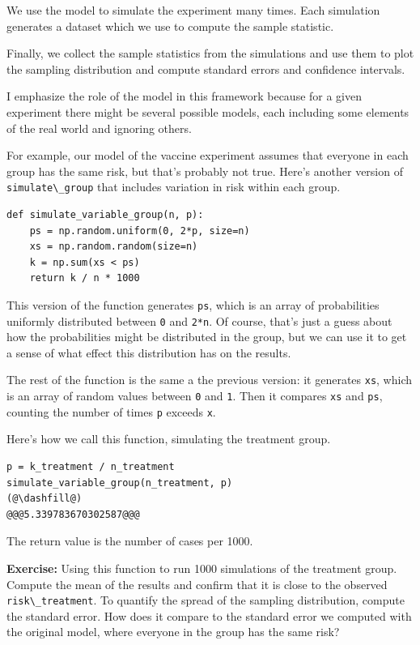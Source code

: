 We use the model to simulate the experiment many times. Each simulation
generates a dataset which we use to compute the sample statistic.

Finally, we collect the sample statistics from the simulations and use
them to plot the sampling distribution and compute standard errors and
confidence intervals.

I emphasize the role of the model in this framework because for a given
experiment there might be several possible models, each including some
elements of the real world and ignoring others.

For example, our model of the vaccine experiment assumes that everyone
in each group has the same risk, but that's probably not true. Here's
another version of \passthrough{\lstinline!simulate\_group!} that
includes variation in risk within each group.

\begin{lstlisting}[]
def simulate_variable_group(n, p):
    ps = np.random.uniform(0, 2*p, size=n)
    xs = np.random.random(size=n)
    k = np.sum(xs < ps)
    return k / n * 1000
\end{lstlisting}

This version of the function generates \passthrough{\lstinline!ps!},
which is an array of probabilities uniformly distributed between
\passthrough{\lstinline!0!} and \passthrough{\lstinline!2*n!}. Of
course, that's just a guess about how the probabilities might be
distributed in the group, but we can use it to get a sense of what
effect this distribution has on the results.

The rest of the function is the same a the previous version: it
generates \passthrough{\lstinline!xs!}, which is an array of random
values between \passthrough{\lstinline!0!} and
\passthrough{\lstinline!1!}. Then it compares
\passthrough{\lstinline!xs!} and \passthrough{\lstinline!ps!}, counting
the number of times \passthrough{\lstinline!p!} exceeds
\passthrough{\lstinline!x!}.

Here's how we call this function, simulating the treatment group.

\begin{lstlisting}[]
p = k_treatment / n_treatment
simulate_variable_group(n_treatment, p)
(@\dashfill@)
@@@5.339783670302587@@@
\end{lstlisting}

The return value is the number of cases per 1000.

\textbf{Exercise:} Using this function to run 1000 simulations of the
treatment group. Compute the mean of the results and confirm that it is
close to the observed \passthrough{\lstinline!risk\_treatment!}. To
quantify the spread of the sampling distribution, compute the standard
error. How does it compare to the standard error we computed with the
original model, where everyone in the group has the same risk?

